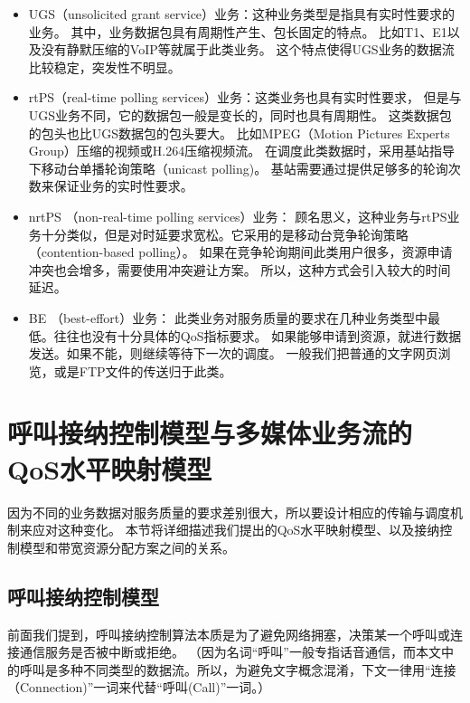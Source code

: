 \begin{itemize}
\item UGS（unsolicited grant service）业务：这种业务类型是指具有实时性要求的业务。
    其中，业务数据包具有周期性产生、包长固定的特点。
    比如T1、E1以及没有静默压缩的VoIP等就属于此类业务。
    这个特点使得UGS业务的数据流比较稳定，突发性不明显。
\item rtPS（real-time polling services）业务：这类业务也具有实时性要求，
    但是与UGS业务不同，它的数据包一般是变长的，同时也具有周期性。
    这类数据包的包头也比UGS数据包的包头要大。
    比如MPEG（Motion Pictures Experts Group）压缩的视频或H.264压缩视频流。
    在调度此类数据时，采用基站指导下移动台单播轮询策略（unicast polling)。
    基站需要通过提供足够多的轮询次数来保证业务的实时性要求。
\item nrtPS （non-real-time polling services）业务：
    顾名思义，这种业务与rtPS业务十分类似，但是对时延要求宽松。它采用的是移动台竞争轮询策略（contention-based polling）。
    如果在竞争轮询期间此类用户很多，资源申请冲突也会增多，需要使用冲突避让方案。
    所以，这种方式会引入较大的时间延迟。
\item BE （best-effort）业务：
    此类业务对服务质量的要求在几种业务类型中最低。往往也没有十分具体的QoS指标要求。
    如果能够申请到资源，就进行数据发送。如果不能，则继续等待下一次的调度。
    一般我们把普通的文字网页浏览，或是FTP文件的传送归于此类。
\end{itemize}

\section{呼叫接纳控制模型与多媒体业务流的QoS水平映射模型}
\label{sec_qos_metric}
因为不同的业务数据对服务质量的要求差别很大，所以要设计相应的传输与调度机制来应对这种变化。
本节将详细描述我们提出的QoS水平映射模型、以及接纳控制模型和带宽资源分配方案之间的关系。

\subsection{呼叫接纳控制模型}
\label{sec_sec_model}
前面我们提到，呼叫接纳控制算法本质是为了避免网络拥塞，决策某一个呼叫或连接通信服务是否被中断或拒绝。
（因为名词“呼叫”一般专指话音通信，而本文中的呼叫是多种不同类型的数据流。所以，为避免文字概念混淆，下文一律用“连接（Connection)”一词来代替“呼叫(Call)”一词。）

